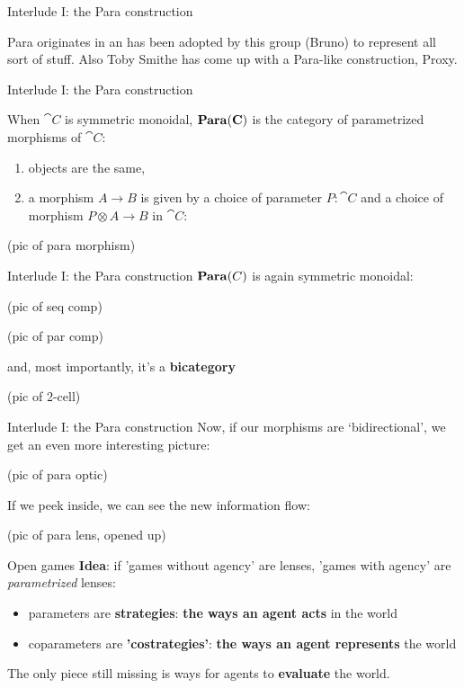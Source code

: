 \begin{frame}{Interlude I: the Para construction}

	Para originates in \cite{backpropasafunctor} an has been adopted by this group (Bruno) to represent all sort of stuff. Also Toby Smithe has come up with a Para-like construction, Proxy.
\end{frame}

\begin{frame}{Interlude I: the Para construction}
	\begin{definition}
		When $\cat C$ is symmetric monoidal, $\mathbf{Para}(\mathbf{C})$ is the category of parametrized morphisms of $\cat C$:
		\begin{enumerate}
			\item objects are the same,
			\item a morphism $A \to B$ is given by a choice of parameter $P : \cat C$ and a choice of morphism $P \otimes A \to B$ in $\cat C$:
		\end{enumerate}
	\end{definition}

	(pic of para morphism)
\end{frame}


\begin{frame}{Interlude I: the Para construction}
	$\mathbf{Para}(C)$ is again symmetric monoidal:

	(pic of seq comp)

	(pic of par comp)

	and, most importantly, it's a \textbf{bicategory}

	(pic of 2-cell)
\end{frame}

\begin{frame}{Interlude I: the Para construction}
	Now, if our morphisms are `bidirectional', we get an even more interesting picture:

	(pic of para optic)

	If we peek inside, we can see the new information flow:

	(pic of para lens, opened up)
\end{frame}

\begin{frame}{Open games}
	\textbf{Idea}: if 'games without agency' are lenses, 'games with agency' are \emph{parametrized} lenses:

	\begin{itemize}
		\item parameters are \textbf{strategies}: \textbf{the ways an agent acts} in the world
		\item coparameters are \textbf{'costrategies'}: \textbf{the ways an agent represents} the world
	\end{itemize}

	The only piece still missing is ways for agents to \textbf{evaluate} the world.
\end{frame}

